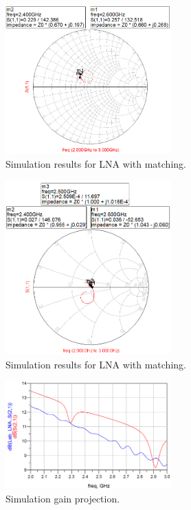 \documentclass[conference]{IEEEtran}
\begin{document}
\begin{figure}[!h]
\centering
\includegraphics[width=2.5in]{amplifier_simulation_pics/MMIC_unmatched_circuit-with-transmission-lines.PNG}
\caption{Simulation results for LNA with matching.}
\label{fig:LNA_Smith_unmatched}
\end{figure}

\begin{figure}[!h]
\centering
\includegraphics[width=2.5in]{amplifier_simulation_pics/MMIC_matched_circuit-with-transmission-lines.PNG}
\caption{Simulation results for LNA with matching.}
\label{fig:LNA_Smith_matched}
\end{figure}

\begin{figure}[!h]
\centering
\includegraphics[width=2.5in]{amplifier_simulation_pics/lnaS21.PNG}
\caption{Simulation gain projection.}
\label{fig:LNA_sim_gain}
\end{figure}
\end{document}
